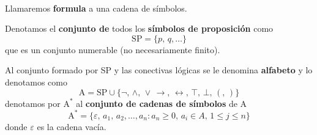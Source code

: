 \paragraph{}
\begin{definition} Llamaremos \textbf{formula} a una cadena de símbolos.
\end{definition}

\begin{definition} Denotamos el \textbf{conjunto de} todos los \textbf{símbolos de proposición} como 
	\[ \mbox{SP}=\{p, \, q, \ldots \} \]
	que es un conjunto numerable (no necesariamente finito). 
\end{definition}

\begin{definition} Al conjunto formado por SP y las conectivas lógicas se le denomina \textbf{alfabeto} y lo denotamos como 
	\[ \mbox{A}= \mbox{SP} \cup \{ \lnot, \, \wedge, \, \lor \, \rightarrow, \, \leftrightarrow, \, \top, \, \bot, \, (, \, ) \} \]
	denotamos por $\mbox{A}^*$ al \textbf{conjunto de cadenas de símbolos} de A
	\[ \mbox{A}^*=\{ \varepsilon, \, a_1, \, a_2, \ldots , a_n : a_n \geq 0,\, a_i \in A,\, 1 \leq j \leq n   \} \]
	donde $\varepsilon$ es la cadena vacía. 
\end{definition}

